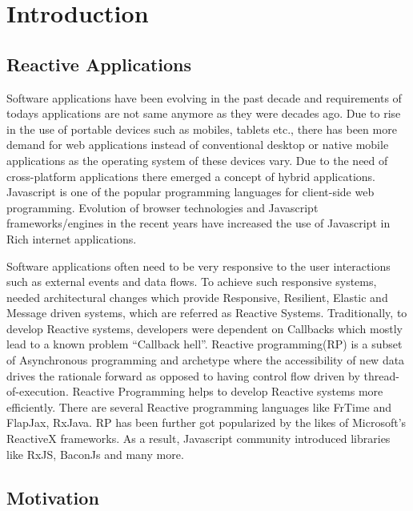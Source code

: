 \chapter{Introduction} \label{chap:Introduction}

\section{Reactive Applications}
Software applications have been evolving in the past decade and requirements of today\textquotesingle s applications are not same anymore as they were decades ago\cite{reactiveManifesto}. 
Due to rise in the use of portable devices such as mobiles, tablets etc., there has been more demand for web applications instead of conventional desktop or native mobile applications as the operating system of these devices vary\cite{7818919}. 
Due to the need of cross-platform applications there emerged a concept of hybrid applications. Javascript is one of the popular programming languages for client-side web programming. Evolution of browser technologies and Javascript frameworks/engines in the recent years have increased the use of Javascript in Rich internet applications\cite{6068340}\cite{Sen:2013:JSR:2491411.2491447}. 

Software applications often need to be very responsive to the user interactions such as external events and data flows. 
To achieve such responsive systems, needed architectural changes which provide Responsive, Resilient, Elastic and Message driven systems, which are referred as Reactive Systems\cite{reactiveManifesto}. Traditionally, to develop Reactive systems, developers were dependent on Callbacks which mostly lead to a known problem ``Callback hell''. 
Reactive programming(RP) is a subset of Asynchronous programming and archetype where the accessibility of new data drives the rationale forward as opposed to having control flow driven by thread-of-execution. 
Reactive Programming helps to develop Reactive systems more efficiently. 
There are several Reactive programming languages like FrTime\cite{Cooper2006} and FlapJax\cite{Meyerovich:2009:FPL:1639949.1640091}, RxJava\cite{rxJava}. RP has been further got popularized by the likes of Microsoft's ReactiveX frameworks\cite{reactiveX}.  As a result, Javascript community introduced libraries like RxJS\cite{rxjs}, BaconJs\cite{baconjs} and many more.


\section{Motivation}

